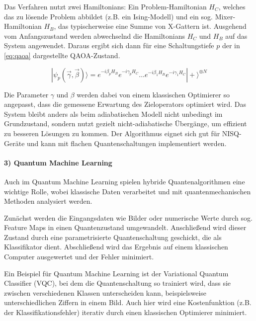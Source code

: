 Das Verfahren nutzt zwei Hamiltonians: Ein Problem-Hamiltonian $H_C$, welches das zu lösende Problem abbildet (z.B. ein Ising-Modell) und ein sog. Mixer-Hamiltonian $H_B$, das typischerweise eine Summe von X-Gattern ist. Ausgehend vom Anfangszustand werden abwechselnd die Hamiltonians $H_C$ und $H_B$ auf das System angewendet. Daraus ergibt sich dann für eine Schaltungstiefe $p$ der in \autoref{eq:qaoa} dargestellte QAOA-Zustand. \autocite[3]{zhou_quantum_2020}

\begin{equation}
    |\psi_p(\vec{\gamma}, \vec{\beta})\rangle = e^{-i\beta_p H_B}e^{-i\gamma_p H_C} \dots e^{-i\beta_1 H_B}e^{-i\gamma_1 H_C} |+\rangle^{\otimes N}
\label{eq:qaoa}
\end{equation}

Die Parameter $\gamma$ und $\beta$ werden dabei von einem klassischen Optimierer so angepasst, dass die gemessene Erwartung des Zieloperators optimiert wird. Das System bleibt anders als beim adiabatischen Modell nicht unbedingt im Grundzustand, sondern nutzt gezielt nicht-adiabatische Übergänge, um effizient zu besseren Lösungen zu kommen. Der Algorithmus eignet sich gut für NISQ-Geräte und kann mit flachen Quantenschaltungen implementiert werden. \autocite[2-9]{zhou_quantum_2020}
\\

\paragraph{3) Quantum Machine Learning}
Auch im Quantum Machine Learning spielen hybride Quantenalgorithmen eine wichtige Rolle, wobei klassische Daten verarbeitet und mit quantenmechanischen Methoden analysiert werden.

Zunächst werden die Eingangsdaten wie Bilder oder numerische Werte durch sog. Feature Maps in einen Quantenzustand umgewandelt. Anschließend wird dieser Zustand durch eine parametrisierte Quantenschaltung geschickt, die als Klassifikator dient. Abschließend wird das Ergebnis auf einem klassischen Computer ausgewertet und der Fehler minimiert.

Ein Beispiel für Quantum Machine Learning ist der Variational Quantum Classifier (VQC), bei dem die Quantenschaltung so trainiert wird, dass sie zwischen verschiedenen Klassen unterscheiden kann, beispielsweise unterschiedlichen Ziffern in einem Bild. Auch hier wird eine Kostenfunktion (z.B. der Klassifikationsfehler) iterativ durch einen klassischen Optimierer minimiert. 


